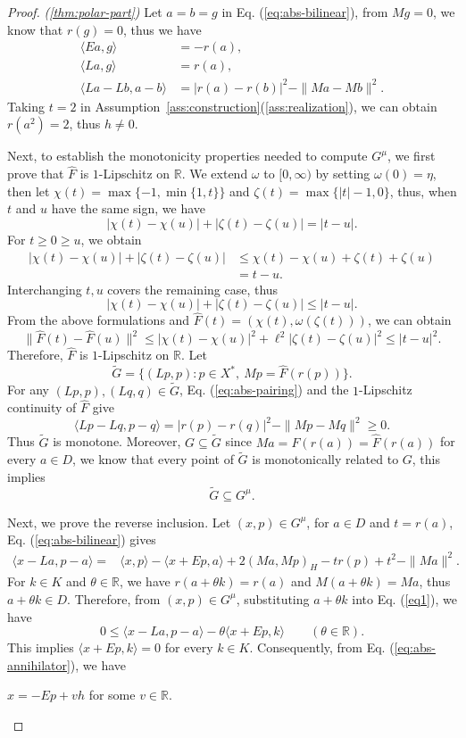 \documentclass[11pt]{article}
\newcommand{\R}{\mathbb R}
\newcommand{\pair}[2]{\langle #1,#2\rangle}
\theoremstyle{definition}
\theoremstyle{remark}
\begin{document}
\begin{proof}
\noindent\textit{\textup{(\ref{thm:polar-part})}}
Let $a=b=g$ in Eq. (\ref{eq:abs-bilinear}), from $Mg=0$, we know that $r(g)=0$, thus we have 
\begin{equation}
\begin{aligned}
\pair{Ea}{g}&=-r(a),\\
\pair{La}{g}&=r(a),\\
\pair{La-Lb}{a-b}&=|r(a)-r(b)|^2-\|Ma-Mb\|^2.
\end{aligned}
\label{eq:abs-pairing}
\end{equation}
Taking $t=2$ in Assumption~\ref{ass:construction}\textup{(\ref{ass:realization})}, we can obtain $r(a^2)=2$, thus $h\ne0$.

Next, to establish the monotonicity properties needed to compute $G^\mu$, we first prove that $\widehat F$ is $1$-Lipschitz on $\R$. 
We extend $\omega$ to $[0,\infty)$ by setting $\omega(0)=\eta$, then let $\chi(t)=\max\{-1,\min\{1,t\}\}$ and $\zeta(t)=\max\{|t|-1,0\}$, thus, when $t$ and $u$ have the same sign, we have 
\[
|\chi(t)-\chi(u)|+|\zeta(t)-\zeta(u)|=|t-u|.
\]
For $t\ge0\ge u$, we obtain
\[
\begin{aligned}
|\chi(t)-\chi(u)|+|\zeta(t)-\zeta(u)|
&\le \chi(t)-\chi(u)+\zeta(t)+\zeta(u)\\
&=t-u.
\end{aligned}
\]
Interchanging $t,u$ covers the remaining case, thus
\[
|\chi(t)-\chi(u)|+|\zeta(t)-\zeta(u)|\le|t-u|.
\]
From the above formulations and $\widehat F(t)=(\chi(t),\omega(\zeta(t)))$, we can obtain 
\[
\|\widehat F(t)-\widehat F(u)\|^2
\le|\chi(t)-\chi(u)|^2+\ell^2|\zeta(t)-\zeta(u)|^2
\le|t-u|^2.
\]
Therefore, $\widehat F$ is $1$-Lipschitz on $\R$. Let 
\[
\widetilde G
=
\{(Lp,p):p\in X^*,\ Mp=\widehat F(r(p))\}.
\]
For any $(Lp,p),(Lq,q)\in\widetilde G$, Eq. (\ref{eq:abs-pairing}) and the $1$-Lipschitz continuity of $\widehat F$ give
\[
\pair{Lp-Lq}{p-q}
=
|r(p)-r(q)|^2-\|Mp-Mq\|^2
\ge0.
\]
Thus $\widetilde G$ is monotone. Moreover, $G\subseteq\widetilde G$ since $Ma=F(r(a))=\widehat F(r(a))$ for every $a\in D$, we know that every point of $\widetilde G$ is monotonically related to $G$, this implies
\[
\widetilde G\subseteq G^\mu.
\]


Next, we prove the reverse inclusion. Let $(x,p)\in G^\mu$, for $a\in D$ and $t=r(a)$, Eq. (\ref{eq:abs-bilinear}) gives
\begin{align}
\pair{x-La}{p-a}
={}&\pair{x}{p}-\pair{x+Ep}{a}
       +2(Ma,Mp)_H-t r(p)+t^2-\|Ma\|^2. \label{eq1}
\end{align}
For $k\in K$ and $\theta\in\R$, we have
$r(a+\theta k)=r(a)$ and $M(a+\theta k)=Ma$, thus $a+\theta k\in D$.
Therefore, from $(x,p)\in G^\mu$, substituting $a+\theta k$ into Eq. (\ref{eq1}), we have
\[
0\le
\pair{x-La}{p-a}
-\theta\pair{x+Ep}{k}
\qquad(\theta\in\R).
\]
This implies $\pair{x+Ep}{k}=0$ for every $k\in K$.
Consequently, from Eq. (\ref{eq:abs-annihilator}), we have
\begin{center}
$x=-Ep+vh$ for some $v\in\R$.    
\end{center}




\end{proof}
\end{document}
